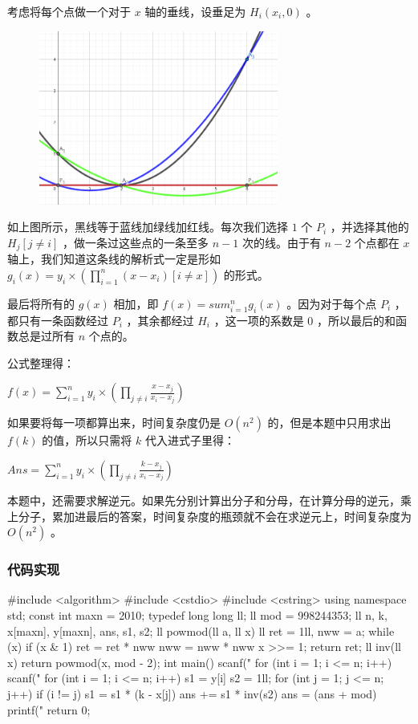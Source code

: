 考虑将每个点做一个对于 $x$ 轴的垂线，设垂足为 $H_i(x_i,0)$ 。

\begin{figure}[htbp]
\centering
\includegraphics[width=0.7\textwidth]{docs/math/images/lagrange-poly-1.png} 

\end{figure}

如上图所示，黑线等于蓝线加绿线加红线。每次我们选择 $1$ 个 $P_i$ ，并选择其他的 $H_j[j\neq i]$ ，做一条过这些点的一条至多 $n-1$ 次的线。由于有 $n-2$ 个点都在 $x$ 轴上，我们知道这条线的解析式一定是形如 $g_i(x)=y_i\times (\prod_{i=1}^{n} (x-x_i)[i\neq x])$ 的形式。

最后将所有的 $g(x)$ 相加，即 $f(x)=sum_{i=1}^{n}g_i(x)$ 。因为对于每个点 $P_i$ ，都只有一条函数经过 $P_i$ ，其余都经过 $H_i$ ，这一项的系数是 $0$ ，所以最后的和函数总是过所有 $n$ 个点的。

公式整理得：

$f(x)=\sum_{i=1}^{n} y_i\times(\prod_{j\neq i }\frac{x-x_j}{x_i-x_j})$

如果要将每一项都算出来，时间复杂度仍是 $O(n^2)$ 的，但是本题中只用求出 $f(k)$ 的值，所以只需将 $k$ 代入进式子里得：

$Ans=\sum_{i=1}^{n} y_i\times(\prod_{j\neq i }\frac{k-x_j}{x_i-x_j})$

本题中，还需要求解逆元。如果先分别计算出分子和分母，在计算分母的逆元，乘上分子，累加进最后的答案，时间复杂度的瓶颈就不会在求逆元上，时间复杂度为 $O(n^2)$ 。

\subsubsection{代码实现}

\begin{cppcode}
#include <algorithm>
#include <cstdio>
#include <cstring>
using namespace std;
const int maxn = 2010;
typedef long long ll;
ll mod = 998244353;
ll n, k, x[maxn], y[maxn], ans, s1, s2;
ll powmod(ll a, ll x) {
  ll ret = 1ll, nww = a;
  while (x) {
    if (x & 1) ret = ret * nww %
    nww = nww * nww %
    x >>= 1;
  }
  return ret;
}
ll inv(ll x) { return powmod(x, mod - 2); }
int main() {
  scanf("%
  for (int i = 1; i <= n; i++) scanf("%
  for (int i = 1; i <= n; i++) {
    s1 = y[i] %
    s2 = 1ll;
    for (int j = 1; j <= n; j++)
      if (i != j)
        s1 = s1 * (k - x[j]) %
    ans += s1 * inv(s2) %
    ans = (ans + mod) %
  }
  printf("%
  return 0;
}
\end{cppcode}
